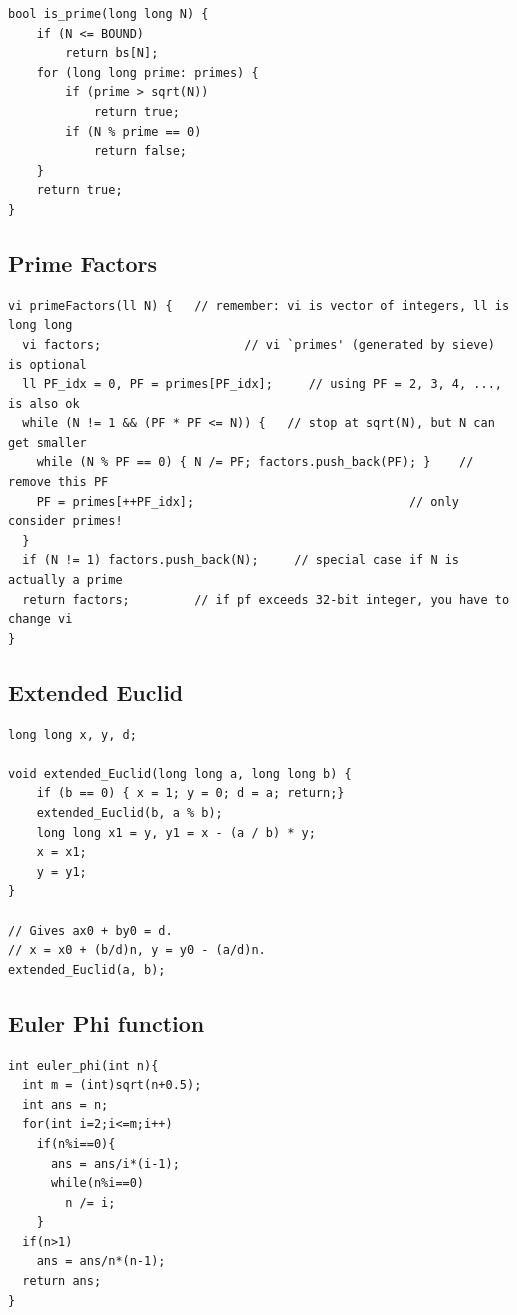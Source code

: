 \documentclass[10pt,landscape]{article}
\begin{document}
\begin{multicols}{2}
\begin{lstlisting}
bool is_prime(long long N) {
    if (N <= BOUND)
        return bs[N];
    for (long long prime: primes) {
        if (prime > sqrt(N))
            return true;
        if (N % prime == 0)
            return false;
    }
    return true;
}
\end{lstlisting}
\newpage

\subsection{Prime Factors}
\begin{lstlisting}
vi primeFactors(ll N) {   // remember: vi is vector of integers, ll is long long
  vi factors;                    // vi `primes' (generated by sieve) is optional
  ll PF_idx = 0, PF = primes[PF_idx];     // using PF = 2, 3, 4, ..., is also ok
  while (N != 1 && (PF * PF <= N)) {   // stop at sqrt(N), but N can get smaller
    while (N % PF == 0) { N /= PF; factors.push_back(PF); }    // remove this PF
    PF = primes[++PF_idx];                              // only consider primes!
  }
  if (N != 1) factors.push_back(N);     // special case if N is actually a prime
  return factors;         // if pf exceeds 32-bit integer, you have to change vi
}
\end{lstlisting}

\subsection{Extended Euclid}
\begin{lstlisting}
long long x, y, d;

void extended_Euclid(long long a, long long b) {
    if (b == 0) { x = 1; y = 0; d = a; return;}
    extended_Euclid(b, a % b);
    long long x1 = y, y1 = x - (a / b) * y;
    x = x1;
    y = y1;
}

// Gives ax0 + by0 = d.
// x = x0 + (b/d)n, y = y0 - (a/d)n.
extended_Euclid(a, b);

\end{lstlisting}

\subsection{Euler Phi function}
\begin{lstlisting}
int euler_phi(int n){
  int m = (int)sqrt(n+0.5);
  int ans = n;
  for(int i=2;i<=m;i++)
    if(n%i==0){
      ans = ans/i*(i-1);
      while(n%i==0)
        n /= i;
    }
  if(n>1)
    ans = ans/n*(n-1);
  return ans;
}


\end{lstlisting}
\end{multicols}
\end{document}
